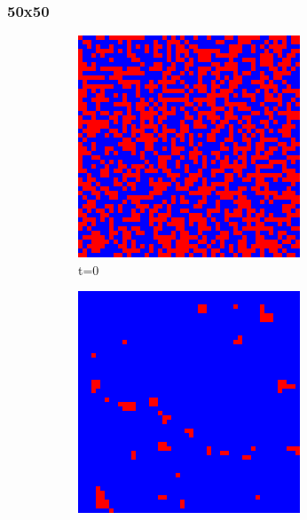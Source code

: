\documentclass[a4paper, 11pt]{article}
\begin{document}
\subsubsection{50x50}
\begin{figure}[H]
\centering
\begin{subfigure}{.16\textwidth}
  \centering
  \includegraphics[width=0.9\linewidth]{PRISONERS_DILEMMA_MOORE_50x50_t00}
  \caption{t=0}
\end{subfigure}%
\begin{subfigure}{.16\textwidth}
  \centering
  \includegraphics[width=0.9\linewidth]{PRISONERS_DILEMMA_MOORE_50x50_t01}

\end{subfigure}
\end{figure}
\end{document}

